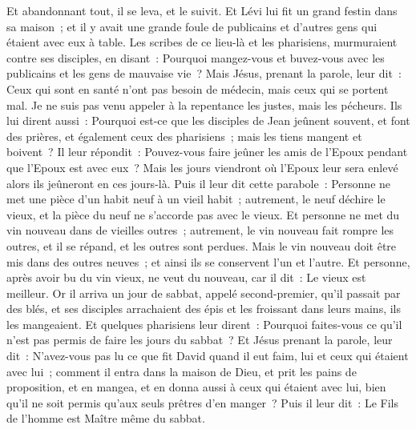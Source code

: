 \begin{multicols}{2}
Et abandonnant tout, il se leva, et le suivit.
Et Lévi lui fit un grand festin dans sa maison~; et il y avait une grande foule de publicains et d'autres gens qui étaient avec eux à table.
Les scribes de ce lieu-là et les pharisiens, murmuraient contre ses disciples, en disant~: Pourquoi mangez-vous et buvez-vous avec les publicains et les gens de mauvaise vie~?
Mais Jésus, prenant la parole, leur dit~: Ceux qui sont en santé n'ont pas besoin de médecin, mais ceux qui se portent mal.
Je ne suis pas venu appeler à la repentance les justes, mais les pécheurs.
Ils lui dirent aussi~: Pourquoi est-ce que les disciples de Jean jeûnent souvent, et font des prières, et également ceux des pharisiens~; mais les tiens mangent et boivent~?
Il leur répondit~: Pouvez-vous faire jeûner les amis de l'Epoux pendant que l'Epoux est avec eux~?
Mais les jours viendront où l'Epoux leur sera enlevé alors ils jeûneront en ces jours-là.
Puis il leur dit cette parabole~: Personne ne met une pièce d'un habit neuf à un vieil habit~; autrement, le neuf déchire le vieux, et la pièce du neuf ne s'accorde pas avec le vieux.
Et personne ne met du vin nouveau dans de vieilles outres~; autrement, le vin nouveau fait rompre les outres, et il se répand, et les outres sont perdues.
Mais le vin nouveau doit être mis dans des outres neuves~; et ainsi ils se conservent l'un et l'autre.
Et personne, après avoir bu du vin vieux, ne veut du nouveau, car il dit~: Le vieux est meilleur.
\VerseOne{}Or il arriva un jour de sabbat, appelé second-premier, qu'il passait par des blés, et ses disciples arrachaient des épis et les froissant dans leurs mains, ils les mangeaient.
Et quelques pharisiens leur dirent~: Pourquoi faites-vous ce qu'il n'est pas permis de faire les jours du sabbat~?
Et Jésus prenant la parole, leur dit~: N'avez-vous pas lu ce que fit David quand il eut faim, lui et ceux qui étaient avec lui~;
comment il entra dans la maison de Dieu, et prit les pains de proposition, et en mangea, et en donna aussi à ceux qui étaient avec lui, bien qu'il ne soit permis qu'aux seuls prêtres d'en manger~?
Puis il leur dit~: Le Fils de l'homme est Maître même du sabbat.

\end{multicols}
